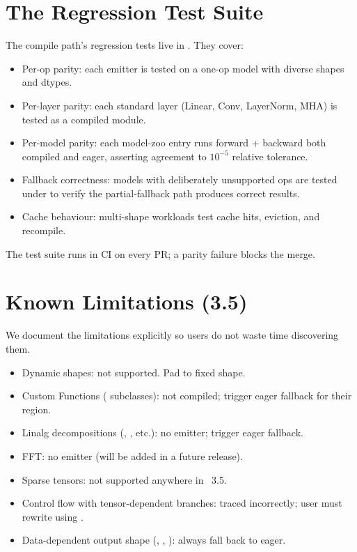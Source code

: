 \section{The Regression Test Suite}
\label{sec:compile_hardening:regression_tests}

The compile path's regression tests live in
. They cover:

\begin{itemize}
  \item Per-op parity: each emitter is tested on a one-op model
    with diverse shapes and dtypes.
  \item Per-layer parity: each standard layer (Linear, Conv,
    LayerNorm, MHA) is tested as a compiled module.
  \item Per-model parity: each model-zoo entry runs forward +
    backward both compiled and eager, asserting agreement to
    $10^{-5}$ relative tolerance.
  \item Fallback correctness: models with deliberately
    unsupported ops are tested under  to
    verify the partial-fallback path produces correct results.
  \item Cache behaviour: multi-shape workloads test cache hits,
    eviction, and recompile.
\end{itemize}

The test suite runs in CI on every PR; a parity failure blocks
the merge.

\section{Known Limitations (3.5)}
\label{sec:compile_hardening:known_limits}

We document the limitations explicitly so users do not waste
time discovering them.

\begin{itemize}
  \item Dynamic shapes: not supported. Pad to fixed shape.
  \item Custom Functions ( subclasses):
    not compiled; trigger eager fallback for their region.
  \item Linalg decompositions (, , etc.):
    no emitter; trigger eager fallback.
  \item FFT: no emitter (will be added in a future release).
  \item Sparse tensors: not supported anywhere in \Lucid\ 3.5.
  \item Control flow with tensor-dependent branches: traced
    incorrectly; user must rewrite using .
  \item Data-dependent output shape (,
    , ): always fall back to
    eager.
\end{itemize}

